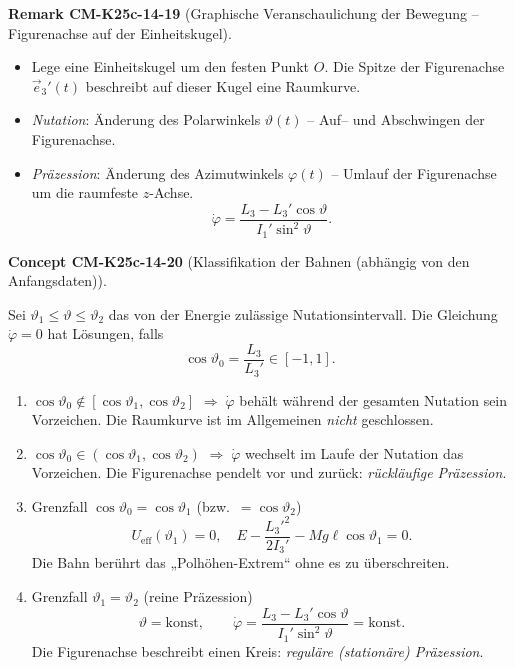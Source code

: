 \documentclass[10pt, letterpaper]{article}
\newcommand{\CustomHeading}[3]{%
  \par\medskip\noindent%
  \textbf{#1 #2} \textnormal{(#3)}.\enskip%
}
\newenvironment{REM}[2]{\CustomHeading{Remark}{#1}{#2}}{}
\newenvironment{CONC}[2]{\CustomHeading{Concept}{#1}{#2}}{}
\begin{document}
\begin{REM}{CM-K25c-14-19}{Graphische Veranschaulichung der Bewegung – Figurenachse auf der Einheitskugel}
\begin{itemize}
  \item Lege eine Einheitskugel um den festen Punkt $O$.  
        Die Spitze der Figurenachse $\vec e_3'(t)$ beschreibt auf dieser Kugel eine Raumkurve.
  \item \emph{Nutation}: Änderung des Polarwinkels $\vartheta(t)$ – Auf– und Ab­schwingen der Figurenachse.
  \item \emph{Präzession}: Änderung des Azimutwinkels $\varphi(t)$ – Umlauf der Figurenachse um die raumfeste $z$-Achse.  
        \[
          \dot\varphi
          =\frac{L_3-L_3'\cos\vartheta}{I_1'\sin^{2}\vartheta}.
        \]
\end{itemize}
\end{REM}

\begin{CONC}{CM-K25c-14-20}{Klassifikation der Bahnen (abhängig von den Anfangsdaten)}
Sei $\vartheta_1\le\vartheta\le\vartheta_2$ das von der Energie zulässige Nutationsintervall.  
Die Gleichung $\dot\varphi=0$ hat Lösungen, falls
\[
  \cos\vartheta_0=\frac{L_3}{L_3'}\in[-1,1].
\]

\begin{enumerate}
  \item $\cos\vartheta_0\notin[\cos\vartheta_1,\cos\vartheta_2]$  
        $\Rightarrow\;\dot\varphi$ behält während der gesamten Nutation sein Vorzeichen.  
        Die Raumkurve ist im Allgemeinen \emph{nicht} geschlossen.
  \item $\cos\vartheta_0\in(\cos\vartheta_1,\cos\vartheta_2)$  
        $\Rightarrow\;\dot\varphi$ wechselt im Laufe der Nutation das Vorzeichen.  
        Die Figurenachse pendelt vor und zurück: \emph{rückläufige Präzession}.
  \item Grenzfall $\cos\vartheta_0=\cos\vartheta_1$ (bzw.\ $=\cos\vartheta_2$)  
        \[
          U_{\mathrm{eff}}(\vartheta_1)=0,
          \quad
          E-\frac{L_3'^{2}}{2I_3'}-Mg\ell\cos\vartheta_1=0.
        \] 
        Die Bahn berührt das „Polhöhen-Extrem“ ohne es zu überschreiten.
  \item Grenzfall $\vartheta_1=\vartheta_2$ (reine Präzession)  
        \[
          \vartheta=\text{konst},
          \qquad
          \dot\varphi=\frac{L_3-L_3'\cos\vartheta}{I_1'\sin^{2}\vartheta}=\text{konst}.
        \]
        Die Figurenachse beschreibt einen Kreis: \emph{reguläre (stationäre) Präzession}.
\end{enumerate}
\end{CONC}
\end{document}
